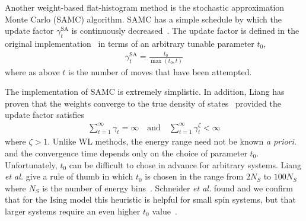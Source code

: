 \documentclass[letterpaper,twocolumn,amsmath,amssymb,pre,aps,10pt]{revtex4-1}
\begin{document}
Another weight-based flat-histogram method is
the stochastic approximation Monte Carlo (SAMC) algorithm. SAMC has a simple
schedule by which the update factor $\gamma^{\text{SA}}_t$ is continuously
decreased~\cite{liang2007stochastic, werlich2015stochastic,
schneider2017convergence}.  The update factor is defined in the
original implementation~\cite{liang2007stochastic} in terms of an
arbitrary tunable parameter $t_0$,
\begin{align}
\gamma_{t}^{\text{SA}} =\frac{t_0}{\max(t_0,t)}
\end{align}
where as above $t$ is the number of moves that have been attempted.

The implementation of SAMC is extremely simplistic.
In addition, Liang has proven that the weights converge to the true
density of states~\cite{liang2006theory, liang2007stochastic,
liang2009improving} provided the update factor satisfies
\begin{align}
\sum_{t=1}^\infty \gamma_{t} = \infty \quad\textrm{and}\quad
\sum_{t=1}^\infty \gamma_{t}^\zeta < \infty
\end{align}
where $\zeta > 1$.  Unlike WL methods, the energy range need not be
known \emph{a priori.} and the convergence time depends only on the choice of
parameter $t_0$.
Unfortunately, $t_0$ can be difficult to chose in advance
for arbitrary systems.
Liang \emph{et al.} give a rule of thumb in
which $t_0$ is chosen in the range from $2N_S$ to $100N_S$ where $N_S$
is the number of energy bins~\cite{liang2007stochastic}.  Schneider
\emph{et al.} found and we confirm that for the Ising model this heuristic is helpful for small spin systems, but that larger systems require an even higher
$t_0$ value~\cite{schneider2017convergence}.
\end{document}
